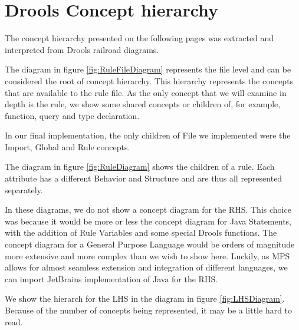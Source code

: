 \chapter{Drools Concept hierarchy}
\label{appendix:DroolsConceptHierarchy}

The concept hierarchy presented on the following pages was extracted and interpreted from Drools railroad diagrams.

The diagram in figure \ref{fig:RuleFileDiagram} represents the file level and can be considered the root of concept hierarchy.
This hierarchy represents the concepts that are available to the rule file.
As the only concept that we will examine in depth is the rule, we show some shared concepts or children of, for example, function, query and type declaration.

In our final implementation, the only children of File we implemented were the Import, Global and Rule concepts.

The diagram in figure \ref{fig:RuleDiagram} shows the children of a rule.
Each attribute has a different Behavior and Structure and are thus all represented separately.

In these diagrams, we do not show a concept diagram for the RHS.
This choice was because it would be more or less the concept diagram for Java Statements, with the addition of Rule Variables and some special Drools functions.
The concept diagram for a General Purpose Language would be orders of magnitude more extensive and more complex than we wish to show here.
Luckily, as MPS allows for almost seamless extension and integration of different languages, we can import JetBrains implementation of Java for the RHS.

We show the hierarch for the LHS in the diagram in figure \ref{fig:LHSDiagram}.
Because of the number of concepts being represented, it may be a little hard to read.

